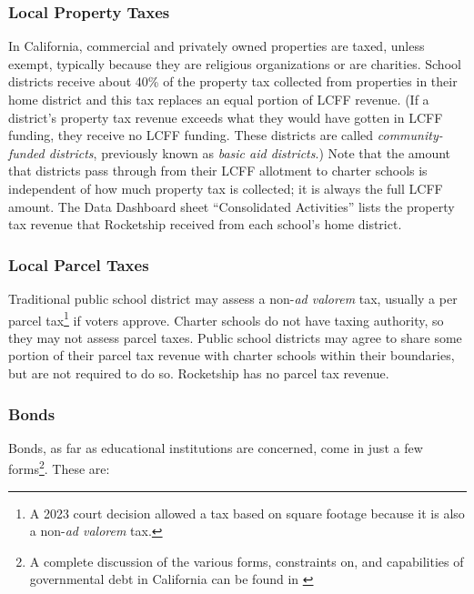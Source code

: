\subsubsection{Local Property Taxes}%
\label{sec:property-taxes}\indent%

In California, commercial and privately owned properties are taxed, unless exempt, typically because they are religious organizations or are charities. School districts receive about 40\% of the property tax collected from properties in their home district and this tax replaces an equal portion of LCFF revenue. (If a district's property tax revenue exceeds what they would have gotten in LCFF funding, they receive no LCFF funding. These districts are called \textit{community-funded districts}, previously known as \textit{basic aid districts}.) Note that the amount that districts pass through from their LCFF allotment to charter schools is independent of how much property tax is collected; it is always the full LCFF amount. The Data Dashboard sheet ``Consolidated Activities'' lists the property tax revenue that Rocketship received from each school's home district.

\subsubsection{Local Parcel Taxes}%
\label{sec:parcel-taxes}\indent%

Traditional public school district may assess a non-\textit{ad valorem} tax, usually a per parcel tax\footnote{A 2023 court decision allowed a tax based on square footage because it is also a non-\textit{ad valorem} tax.} if voters approve. Charter schools do not have taxing authority, so they may not assess parcel taxes. Public school districts may agree to share some portion of their parcel tax revenue with charter schools within their boundaries, but are not required to do so. Rocketship has no parcel tax revenue.

\subsubsection{Bonds}%
\label{sec:bonds}\indent%

Bonds, as far as educational institutions are concerned, come in just a few forms\footnote{A complete discussion of the various forms, constraints on, and capabilities of governmental debt in California can be found in  \parencite{CDIAC2023}}. These are:

